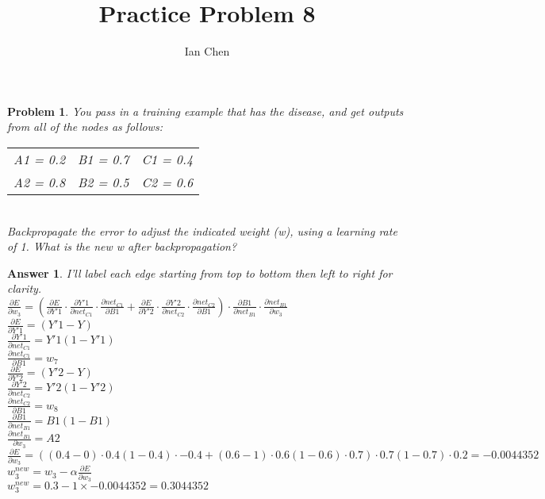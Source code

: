 \documentclass[11pt]{article}
\author{Ian Chen}
\title{Practice Problem 8}
\theoremstyle{description}
\newtheorem{problem}{Problem}
\theoremstyle{break}
\newtheorem*{answer}{Answer}
\begin{document}
    \maketitle

    \begin{problem}
        You pass in a training example that has the disease, and get outputs from all of the
        nodes as follows:\\
        \begin{tabular}{ccc}
            A1 = 0.2 & B1 = 0.7 & C1 = 0.4 \\
            A2 = 0.8 & B2 = 0.5 & C2 = 0.6 \\
        \end{tabular}\\
        Backpropagate the error to adjust the indicated weight (w), using a learning rate of 1.
        What is the new w after backpropagation?
    \end{problem}
    \begin{answer}
        I'll label each edge starting from top to bottom then left to right for clarity.\\
        $\frac{\partial E}{\partial w_3} =
        (\frac{\partial E}{\partial Y'1} \cdot
        \frac{\partial Y'1}{\partial net_{C1}} \cdot
        \frac{\partial net_{C1}}{\partial B1} +
        \frac{\partial E}{\partial Y'2} \cdot
        \frac{\partial Y'2}{\partial net_{C2}} \cdot
        \frac{\partial net_{C2}}{\partial B1}) \cdot
        \frac{\partial B1}{\partial net_{B1}} \cdot
        \frac{\partial net_{B1}}{\partial w_3}$\\
        $\frac{\partial E}{\partial Y'1} = (Y'1 - Y)$\\
        $\frac{\partial Y'1}{\partial net_{C1}} = Y'1(1 - Y'1)$\\
        $\frac{\partial net_{C1}}{\partial B1} = w_7$\\
        $\frac{\partial E}{\partial Y'2} = (Y'2 - Y)$\\
        $\frac{\partial Y'2}{\partial net_{C2}} = Y'2(1 - Y'2)$\\
        $\frac{\partial net_{C2}}{\partial B1} = w_8$\\
        $\frac{\partial B1}{\partial net_{B1}} = B1(1 - B1)$\\
        $\frac{\partial net_{B1}}{\partial w_3} = A2$\\
        $\frac{\partial E}{\partial w_3} = ((0.4 - 0) \cdot 0.4(1 - 0.4) \cdot -0.4 +
        (0.6 - 1) \cdot 0.6(1 - 0.6) \cdot 0.7) \cdot 0.7(1 - 0.7) \cdot 0.2 = -0.0044352$\\
        $w_3^{new} = w_3 - \alpha \frac{\partial E}{\partial w_3}$\\
        $w_3^{new} = 0.3 - 1 \times -0.0044352 = 0.3044352$
    \end{answer}
\end{document}
